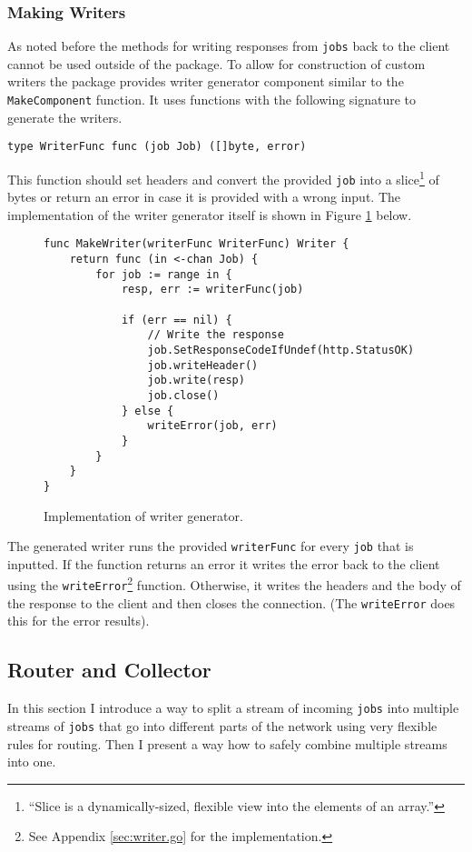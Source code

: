 \subsubsection{Making Writers}
As noted before the methods for writing responses from \texttt{jobs}
back to the client cannot be used outside of the package. To allow
for construction of custom writers the package provides writer generator
component similar to the \texttt{MakeComponent} function. It uses 
functions with the following signature to generate the writers.
\begin{lstlisting}
type WriterFunc func (job Job) ([]byte, error)
\end{lstlisting}
This function should set headers and convert the provided \texttt{job} into 
a slice\footnote{``Slice is a dynamically-sized, flexible view into the elements 
of an array.''\cite{tour}} of bytes or return an error in case it 
is provided with a 
wrong input. The implementation of the writer generator itself is shown
in Figure \ref{fig:MakeWriter} below.
\begin{figure}[h]
\centering
\begin{lstlisting}
func MakeWriter(writerFunc WriterFunc) Writer {
    return func (in <-chan Job) {
        for job := range in {
            resp, err := writerFunc(job)

            if (err == nil) {
                // Write the response
                job.SetResponseCodeIfUndef(http.StatusOK)
                job.writeHeader()
                job.write(resp)
                job.close()
            } else {
                writeError(job, err)
            }
        }       
    }
}
\end{lstlisting}
\caption[scale=1.0]{Implementation of writer generator.}
\label{fig:MakeWriter}
\end{figure}

The generated writer runs the provided \texttt{writerFunc} for every \texttt{job} 
that is inputted. If the function returns an error it writes the error 
back to the client using the \texttt{writeError}\footnote{See Appendix 
\ref{sec:writer.go} for the implementation.} function. Otherwise, it 
writes the headers and the body of the response to the client and then 
closes the connection. (The \texttt{writeError} does this for the error
results).

\subsection{Router and Collector}
In this section I introduce a way to split a stream of incoming \texttt{jobs} into
multiple streams of \texttt{jobs} that go into different parts of the network
using very flexible rules for routing. Then I present a way how to
safely combine multiple streams into one.

